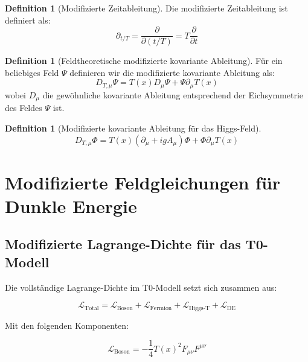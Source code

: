 \documentclass[a4paper,12pt]{article}
\theoremstyle{definition}
\newtheorem{definition}[theorem]{Definition}
\theoremstyle{remark}
\newcommand{\Tfield}{T(x)} %
\newcommand{\DhiggsT}{\Tfield (\partial_\mu + igA_\mu)\Phi + \Phi \partial_\mu \Tfield}
\begin{document}
	\begin{definition}[Modifizierte Zeitableitung]
		Die modifizierte Zeitableitung ist definiert als:
		\begin{equation}
			\partial_{t/T} = \frac{\partial}{\partial(t/T)} = T\frac{\partial}{\partial t}
		\end{equation}
	\end{definition}
	
	\begin{definition}[Feldtheoretische modifizierte kovariante Ableitung]
		Für ein beliebiges Feld $\Psi$ definieren wir die modifizierte kovariante Ableitung als:
		\begin{equation}
			D_{T,\mu}\Psi = \Tfield D_\mu \Psi + \Psi \partial_\mu \Tfield
		\end{equation}
		wobei $D_\mu$ die gewöhnliche kovariante Ableitung entsprechend der Eichsymmetrie des Feldes $\Psi$ ist.
	\end{definition}
	
	\begin{definition}[Modifizierte kovariante Ableitung für das Higgs-Feld]
		\begin{equation}
			D_{T,\mu}\Phi = \DhiggsT
		\end{equation}
	\end{definition}
	
	\section{Modifizierte Feldgleichungen für Dunkle Energie}
	
	\subsection{Modifizierte Lagrange-Dichte für das T0-Modell}
	
	Die vollständige Lagrange-Dichte im T0-Modell setzt sich zusammen aus:
	
	\begin{equation}
		\mathcal{L}_{\text{Total}} = \mathcal{L}_{\text{Boson}} + \mathcal{L}_{\text{Fermion}} + \mathcal{L}_{\text{Higgs-T}} + \mathcal{L}_{\text{DE}}
	\end{equation}
	
	Mit den folgenden Komponenten:
	
	\begin{equation}
		\mathcal{L}_{\text{Boson}} = -\frac{1}{4} \Tfield^2 F_{\mu\nu}F^{\mu\nu}
	\end{equation}
	
\end{document}
